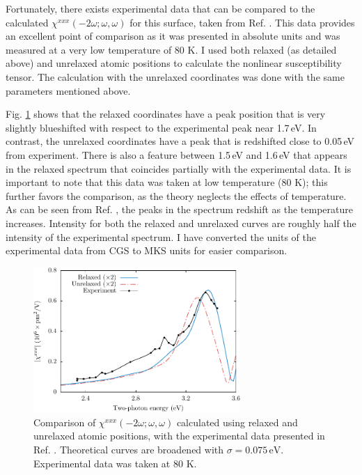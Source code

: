 Fortunately, there exists experimental data that can be compared to the
calculated $\chi^{xxx}(-2\omega;\omega,\omega)$ for this surface, taken from
Ref. \cite{hoferAPA96}. This data provides an excellent point of comparison as
it was presented in absolute units and was measured at a very low temperature of
80 K. I used both relaxed (as detailed above) and unrelaxed atomic positions to
calculate the nonlinear susceptibility tensor. The calculation with the
unrelaxed coordinates was done with the same parameters mentioned above.

Fig. \ref{fig:Xxxx} shows that the relaxed coordinates have a peak position that
is very slightly blueshifted with respect to the experimental peak near 1.7\,eV.
In contrast, the unrelaxed coordinates have a peak that is redshifted close to
0.05\,eV from experiment. There is also a feature between 1.5\,eV and 1.6\,eV
that appears in the relaxed spectrum that coincides partially with the
experimental data. It is important to note that this data was taken at low
temperature (80 K); this further favors the comparison, as the theory neglects
the effects of temperature. As can be seen from Ref. \cite{hoferAPA96}, the
peaks in the spectrum redshift as the temperature increases. Intensity for both
the relaxed and unrelaxed curves are roughly half the intensity of the
experimental spectrum. I have converted the units of the experimental data from
CGS to MKS units for easier comparison.

\begin{figure}
\centering
\includegraphics[width=0.7\textwidth]{figures/fig-4_3_01}
\caption{Comparison of
$\chi^{xxx}(-2\omega;\omega,\omega)$ calculated using relaxed and unrelaxed
atomic positions, with the experimental data presented in Ref.
\cite{hoferAPA96}. Theoretical curves are broadened with
$\sigma=0.075\,\text{eV}$. Experimental data was taken at 80 K.}
\label{fig:Xxxx}
\end{figure}

